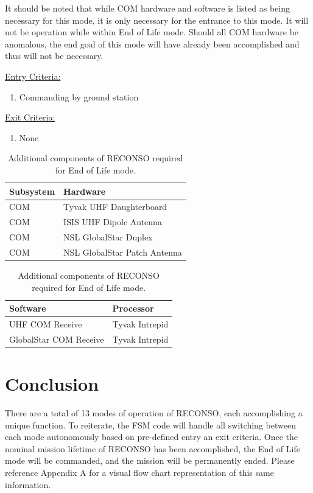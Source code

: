\documentclass{article}
\begin{document}
It should be noted that while COM hardware and software is listed as being necessary for this mode, it is only necessary for the entrance to this mode. It will not be operation while within End of Life mode. Should all COM hardware be anomalous, the end goal of this mode will have already been accomplished and thus will not be necessary.

\underline{Entry Criteria:} 

\begin{enumerate}
\item Commanding by ground station
\end{enumerate}

\underline{Exit Criteria:}

\begin{enumerate}
\item None
\end{enumerate}

\begin{table}[h!]
\caption{Additional components of RECONSO required for End of Life mode.}
\begin{adjustbox}{center}
\begin{tabular}{|l|l|}
\hline
Subsystem & Hardware \\ \hline \hline
COM & Tyvak UHF Daughterboard  \\ \hline
COM & ISIS UHF Dipole Antenna  \\ \hline
COM & NSL GlobalStar Duplex  \\ \hline
COM & NSL GlobalStar Patch Antenna \\ \hline
\end{tabular}

\quad

\begin{tabular}{|l|l|}
\hline
Software & Processor \\ \hline \hline
UHF COM Receive & Tyvak Intrepid \\ \hline
GlobalStar COM Receive & Tyvak Intrepid \\ \hline
\end{tabular}
\end{adjustbox}
\end{table}

\section{Conclusion}

There are a total of 13 modes of operation of RECONSO, each accomplishing a unique function. To reiterate, the FSM code will handle all switching between each mode autonomously based on pre-defined entry an exit criteria. Once the nominal mission lifetime of RECONSO has been accomplished, the End of Life mode will be commanded, and the mission will be permanently ended. Please reference Appendix A for a visual flow chart representation of this same information.
\end{document}
